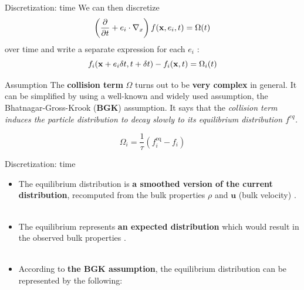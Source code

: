 \documentclass[9pt]{beamer}
\begin{document}
\begin{frame}[t]{Discretization: time}
We can then discretize
\begin{equation*}
\left( \frac{\partial}{\partial t}
      +  e_i \cdot\nabla_x\right)f({\bf x}, e_i, t) = \Omega(t)
\end{equation*}
over time and write a separate expression for each $e_i$ : 
\begin{equation*}
f_i({\bf x} + e_i \delta t, t + \delta t)- f_i({\bf x}, t) = \Omega_i(t)
\end{equation*}

\begin{alertblock}{Assumption}
The \textbf{collision term} $\Omega$ turns out to be \textbf{very complex} in general. It can be simplified by using a well-known and widely used assumption, the Bhatnagar-Gross-Krook (\textbf{BGK}) \cite{lattice_boltzmann_epfl} assumption. It says that the 
\textit{collision term induces the particle distribution to decay slowly to its equilibrium distribution $f^{eq}$.}

\begin{equation*}
\Omega_i = \frac{1}{\tau}\left(f_i^\text{eq} - f_i\right)
\end{equation*}
\end{alertblock}
\end{frame}


\begin{frame}[t]{Discretization: time}
\begin{itemize}
\item The equilibrium distribution is \textbf{a smoothed version of the current distribution}, recomputed from the bulk properties $\rho$ and $\textbf{u}$ (bulk velocity) \cite{lattice_boltzmann}. \\~\\

\item The equilibrium represents \textbf{an expected distribution} which would result in the observed bulk properties \cite{lattice_boltzmann}. \\~\\

\item According to \textbf{the BGK assumption}, the equilibrium distribution can be represented by the following: 

\end{itemize}
\end{frame}
\end{document}

